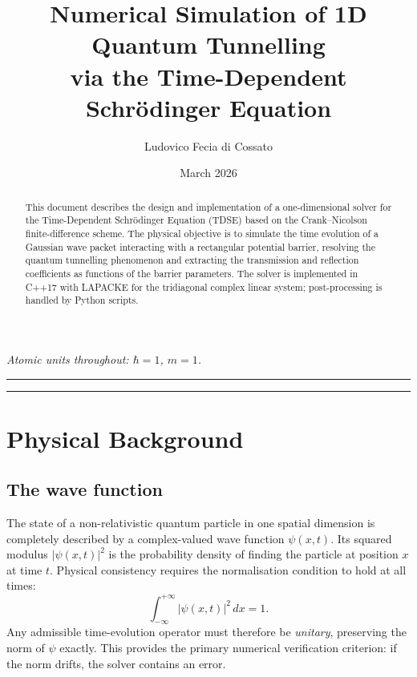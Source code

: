 \documentclass[a4paper,12pt]{article}
\title{{\bf \Large
    Numerical Simulation of 1D Quantum Tunnelling\\[2mm]
    via the Time-Dependent Schr\"{o}dinger Equation}}
\author{Ludovico Fecia di Cossato\\[1mm]}
\date{March 2026}
\begin{document}
\maketitle
\thispagestyle{empty}

\begin{center}
  \small\textit{Atomic units throughout: $\hbar = 1$, $m = 1$.}
\end{center}

\vskip 50mm
\noindent\rule{\textwidth}{0.4pt}

\begin{abstract}
This document describes the design and implementation of a one-dimensional
solver for the Time-Dependent Schr\"{o}dinger Equation (TDSE) based on the
Crank--Nicolson finite-difference scheme.
The physical objective is to simulate the time evolution of a Gaussian wave
packet interacting with a rectangular potential barrier, resolving the quantum
tunnelling phenomenon and extracting the transmission and reflection
coefficients as functions of the barrier parameters.
The solver is implemented in C++17 with LAPACKE for the tridiagonal complex
linear system; post-processing is handled by Python scripts.
\end{abstract}

\noindent\rule{\textwidth}{0.4pt}
\vskip 4mm

\newpage

\section{Physical Background}

\subsection{The wave function}

The state of a non-relativistic quantum particle in one spatial dimension is
completely described by a complex-valued wave function $\psi(x,t)$.
Its squared modulus $|\psi(x,t)|^2$ is the probability density of finding the
particle at position $x$ at time $t$.
Physical consistency requires the normalisation condition to hold at all times:
\begin{equation}
  \int_{-\infty}^{+\infty} |\psi(x,t)|^2 \, dx = 1.
\end{equation}
Any admissible time-evolution operator must therefore be \emph{unitary},
preserving the norm of $\psi$ exactly.
This provides the primary numerical verification criterion: if the norm drifts,
the solver contains an error.
\end{document}
